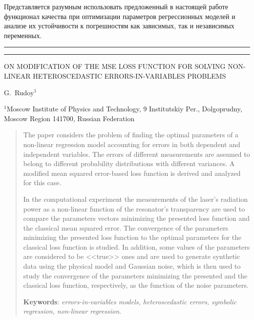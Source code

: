 \documentclass[tikz,10pt,a4paper]{article}
\begin{document}
Представляется разумным использовать предложенный в настоящей работе функционал
качества при оптимизации параметров регрессионных моделей и анализе их
устойчивости к погрешностям как зависимых, так и независимых
переменных\cite{Rudoy15MonteCarlo,Rudoy16StabilityAnalysis}.

\FloatBarrier




\begin{center}
  \rule{\textwidth}{1pt}
  \rule{\textwidth}{1pt}
\end{center}

\begin{center}
  \uppercase{On modification of the MSE loss function for solving non-linear heteroscedastic errors-in-variables problems}

  \bigskip
  G.~Rudoy$^1$
\end{center}

$^1$Moscow Institute of Physics and Technology, 9 Institutskiy Per.,
Dolgoprudny, Moscow Region 141700, Russian Federation

\renewcommand{\abstractname}{Abstract}

\begin{abstract}
  The paper considers the problem of finding the optimal parameters of a
  non-linear regression model accounting for errors in both dependent and
  independent variables. The errors of different measurements are assumed to
  belong to different probability distributions with different variances.
  A modified mean squared error-based loss function is derived and analyzed
  for this case.

  In the computational experiment the measurements of the laser's radiation
  power as a non-linear function of the resonator's transparency are used to
  compare the parameters vectors minimizing the presented
  loss function and the classical mean squared error.
  The convergence of the parameters minimizing the presented loss function
  to the optimal parameters for the classical loss function is studied.
  In addition, some values of the parameters are considered to be <<true>>
  ones and are used to generate synthetic data using the physical model and
  Gaussian noise, which is then used to study the convergence of the parameters
  minimizing the presented and the classical loss function, respectively, as
  the function of the noise parameters.

  \textbf{Keywords}: \emph{errors-in-variables models, heteroscedastic errors,
  symbolic regression, non-linear regression}.
\end{abstract}
\end{document}
